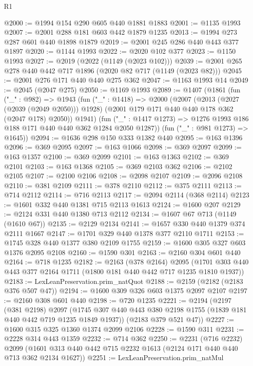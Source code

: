 \begin{lexlean}{R1}
\begin{coremodule}
@2000 := @1994 @154 @290 @605 @440 @1881 @1883
@2001 := @1135 @1993
@2007 := @2001 @288 @181 @603 @442 @1879 @1235
@2013 := @1994 @273 @287 @601 @440 @1898 @1879
@2019 := @2001 @245 @286 @440 @443 @377 @1897
@2020 := @1144 @1993
@2022 := @2020 @102 @377
@2023 := @1150 @1993
@2027 := @2019 (@2022 (@1149 (@2023 @102)))
@2039 := @2001 @265 @278 @440 @442 @717 @1896 (@2020 @82 @717 (@1149 (@2023 @82)))
@2045 := @2001 @276 @171 @440 @440 @275 @362
@2047 := @1163 @1993 @14
@2049 := @2045 (@2047 @275)
@2050 := @1169 @1993
@2089 := @1407
    (@1861
      (fun ("_" : @982) =>
      @1943
        (fun ("_" : @1418) =>
        @2000
          (@2007
            (@2013 (@2027 (@2039 (@2049 @2050))) @1928)
            (@2001 @179 @171 @440 @440 @178 @362 (@2047 @178) @2050))
          @1941)
        (fun ("_" : @1417 @1273) => @1276 @1993 @186 @188 @171 @440 @440 @362 @1284 @2050 @1287))
      (fun ("_" : @981 @1273) => @1645))
@2094 := @1636 @298 @150 @333 @1382 @440
@2095 := @163 @1396
@2096 := @369 @2095
@2097 := @163 @1066
@2098 := @369 @2097
@2099 := @163 @1357
@2100 := @369 @2099
@2101 := @163 @1363
@2102 := @369 @2101
@2103 := @163 @1368
@2105 := @369 @2103 @362
@2106 := @2102 @2105
@2107 := @2100 @2106
@2108 := @2098 @2107
@2109 := @2096 @2108
@2110 := @381 @2109
@2111 := @378 @2110
@2112 := @375 @2111
@2113 := @714 @2112
@2114 := @716 @2113
@2117 := @2094 @2114 (@368 @2114)
@2123 := @1601 @332 @440 @1381 @715 @2113 @1613
@2124 := @1600 @207
@2129 := @2124 @331 @440 @1380 @713 @2112
@2134 := @1607 @67 @713 (@1149 (@1610 @67))
@2135 := @2129 @2134
@2141 := @1657 @330 @440 @1379 @374 @2111 @1667
@2147 := @1701 @329 @440 @1378 @377 @2110 @1711
@2153 := @1745 @328 @440 @1377 @380 @2109 @1755
@2159 := @1600 @305 @327 @603 @1376 @2095 @2108
@2160 := @1590 @301
@2163 := @2160 @304 @601 @440
@2164 := @718 @1235
@2182 := @2163
    (@378 @2164)
    @2095
    (@1701 @303 @440 @443 @377 @2164 @1711 (@1800 @181 @440 @442 @717 @1235 @1810 @1937))
@2183 := LexLeanPreservation.prim_natQuot
@2188 := @2159 (@2182 (@2183 @376 @507 @47))
@2194 := @1600 @309 @326 @603 @1375 @2097 @2107
@2197 := @2160 @308 @601 @440
@2198 := @720 @1235
@2221 := @2194
    (@2197
      (@381 @2198)
      @2097
      (@1745 @307 @440 @443 @380 @2198 @1755 (@1839 @181 @440 @442 @719 @1235 @1849 @1937))
      (@2183 @379 @521 @47))
@2227 := @1600 @315 @325 @1360 @1374 @2099 @2106
@2228 := @1590 @311
@2231 := @2228 @314 @443 @1359
@2232 := @714 @362
@2250 := @2231
    (@716 @2232)
    @2099
    (@1601 @313 @440 @442 @715 @2232 @1613 (@2124 @171 @440 @440 @713 @362 @2134 @1627))
@2251 := LexLeanPreservation.prim_natMul

\end{coremodule}
\end{lexlean}
